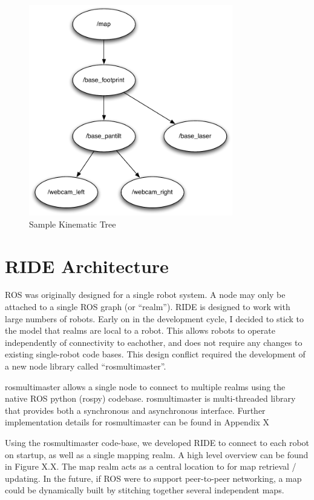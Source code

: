 \begin{figure}[ht]
\begin{center}
\includegraphics[width=3.5in]{images/tf-example.pdf}
\caption{Sample Kinematic Tree\label{fig:tf-example}}
\end{center}
\end{figure}

\section{RIDE Architecture}

ROS was originally designed for a single robot system. A node may only be attached to a single ROS graph (or ``realm''). RIDE is designed to work with large numbers of robots. Early on in the development cycle, I decided to stick to the model that realms are local to a robot. This allows robots to operate independently of connectivity to eachother, and does not require any changes to existing single-robot code bases. This design conflict required the development of a new node library called ``rosmultimaster''.

rosmultimaster allows a single node to connect to multiple realms using the native ROS python (rospy) codebase. rosmultimaster is multi-threaded library that provides both a synchronous and asynchronous interface. Further implementation details for rosmultimaster can be found in Appendix X %

Using the rosmultimaster code-base, we developed RIDE to connect to each robot on startup, as well as a single mapping realm. A high level overview can be found in Figure X.X. The map realm acts as a central location to for map retrieval / updating. In the future, if ROS were to support peer-to-peer networking, a map could be dynamically built by stitching together several independent maps. 

